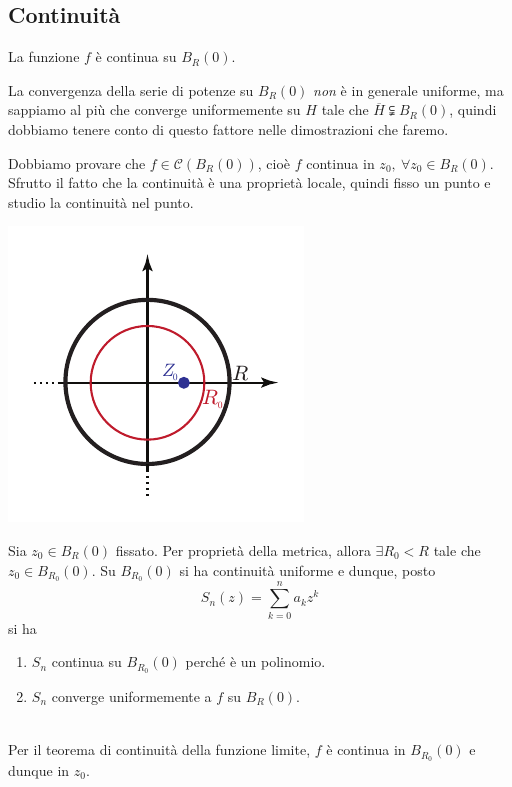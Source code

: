 \subsection{Continuità}
\begin{proposition}
	La funzione $f$ è continua su $B_R\left(0\right)$.
\end{proposition}
\begin{attention}
	La convergenza della serie di potenze su $B_R\left(0\right)$ \textit{non} è in generale uniforme, ma sappiamo al più che converge uniformemente su $H$ tale che $\overline{H}\subsetneqq B_R\left(0\right)$, quindi dobbiamo tenere conto di questo fattore nelle dimostrazioni che faremo.
\end{attention}
\begin{demonstration}
	Dobbiamo provare che $f\in\mathcal{C}\left(B_R\left(0\right)\right)$, cioè $f$ continua in $z_0,\ \forall z_0\in B_R\left(0\right)$. Sfrutto il fatto che la continuità è una proprietà locale, quindi fisso un punto e studio la continuità nel punto.\\	\vspace{3mm}
	\begin{minipage}{0.44\textwidth}
		\includegraphics[trim=0cm 0cm 0cm 0cm, clip, scale=1.1]{images/discoconvergenzacontinuitaf.pdf}
	\end{minipage}\hspace{-9mm}
	\begin{minipage}{0.60\textwidth}
		Sia $z_0\in B_R\left(0\right)$ fissato. Per proprietà della metrica, allora $\exists R_0 < R$ tale che $z_0\in B_{R_0}\left(0\right)$. Su $B_{R_0}\left(0\right)$ si ha continuità uniforme e dunque, posto
		\begin{equation*}
			S_n\left(z\right)=\sum_{k=0}^{n}a_kz^k
		\end{equation*}
		si ha
		\begin{enumerate}
			\item $S_n$ continua su $B_{R_0}\left(0\right)$ perché è un polinomio.
			\item $S_n$ converge uniformemente a $f$ su $B_R\left(0\right)$.
		\end{enumerate}
	\end{minipage}\\
	Per il teorema di continuità della funzione limite, $f$ è continua in $B_{R_0}\left(0\right)$ e dunque in $z_0$. 
\end{demonstration}
